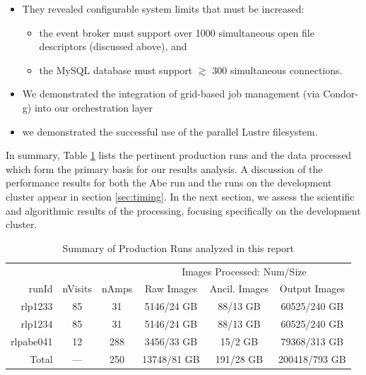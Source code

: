 \begin{itemize}
\item They revealed configurable system limits that must be increased:
\begin{itemize}
\item the event broker must support over 1000 simultaneous open file
  descriptors (discussed above), and 
\item the MySQL database must support $\gtrsim$ 300 simultaneous
  connections.  
\end{itemize}
\item We demonstrated the integration of grid-based job management
  (via Condor-g) into our orchestration layer
\item we demonstrated the successful use of the parallel Lustre
  filesystem.  
\end{itemize}

In summary, Table \ref{tbl:runsummary} lists the pertinent
production runs and the data processed which form the primary basis
for our results analysis.  A discussion of the performance results
for both the Abe run and the runs on the development cluster appear in
section \ref{sec:timing}.  In the next section, we assess the
scientific and algorithmic results of the processing, focusing
specifically on the development cluster.  

\begin{table}[htbp]
\centering
\caption{Summary of Production Runs analyzed in this report
\label{tbl:runsummary}}
\vspace{\baselineskip}
\begin{tabular}{rccccc}
\hline\hline
          &         &       & \multicolumn{3}{c}{Images Processed: Num/Size} \\
runId     & nVisits & nAmps & Raw Images & Ancil. Images & Output Images \\ \hline
rlp1233   & 85      & 31  & 5146/24 GB    & 88/13 GB       & 60525/240 GB \\ 
rlp1234   & 85      & 31  & 5146/24 GB    & 88/13 GB       & 60525/240 GB \\ 
rlpabe041 & 12      & 288 & 3456/33 GB    & 15/2 GB        & 79368/313 GB \\ \hline
Total     & ---     & 250 & 13748/81 GB   & 191/28 GB      & 200418/793 GB \\ \hline
\end{tabular}
\end{table}


